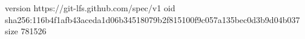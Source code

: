 version https://git-lfs.github.com/spec/v1
oid sha256:116b4f1afb43aceda1d06b34518079b2f815100f9c057a135bec0d3b9d04b037
size 781526
